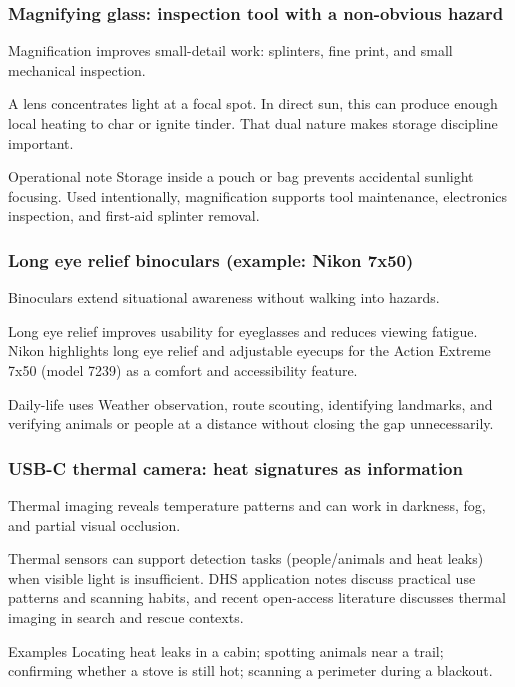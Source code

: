 \begin{frame}[t]
  \frametitle{Magnifying glass: inspection tool with a non-obvious hazard}
  \justifying
   Magnification improves small-detail work: splinters, fine print, and small mechanical inspection.

  \vspace{0.5em}
   A lens concentrates light at a focal spot. In direct sun, this can produce enough local heating to char or ignite tinder. That dual nature makes storage discipline important.

  \vspace{0.8em}
  \begin{block}{Operational note}
    Storage inside a pouch or bag prevents accidental sunlight focusing. Used intentionally, magnification supports tool maintenance, electronics inspection, and first-aid splinter removal.
  \end{block}
\end{frame}

\begin{frame}[t]
  \frametitle{Long eye relief binoculars (example: Nikon 7x50)}
  \justifying
   Binoculars extend situational awareness without walking into hazards.

  \vspace{0.5em}
   Long eye relief improves usability for eyeglasses and reduces viewing fatigue. Nikon highlights long eye relief and adjustable eyecups for the Action Extreme 7x50 (model 7239) as a comfort and accessibility feature.~\cite{nikon_7239}

  \vspace{0.8em}
  \begin{block}{Daily-life uses}
    Weather observation, route scouting, identifying landmarks, and verifying animals or people at a distance without closing the gap unnecessarily.
  \end{block}
\end{frame}

\begin{frame}[t]
  \frametitle{USB-C thermal camera: heat signatures as information}
  \justifying
   Thermal imaging reveals temperature patterns and can work in darkness, fog, and partial visual occlusion.

  \vspace{0.5em}
   Thermal sensors can support detection tasks (people/animals and heat leaks) when visible light is insufficient. DHS application notes discuss practical use patterns and scanning habits, and recent open-access literature discusses thermal imaging in search and rescue contexts.~\cite{dhs_thermal_imagers,wsar_thermal_uav_2025}

  \vspace{0.8em}
  \begin{block}{Examples}
    Locating heat leaks in a cabin; spotting animals near a trail; confirming whether a stove is still hot; scanning a perimeter during a blackout.
  \end{block}
\end{frame}

